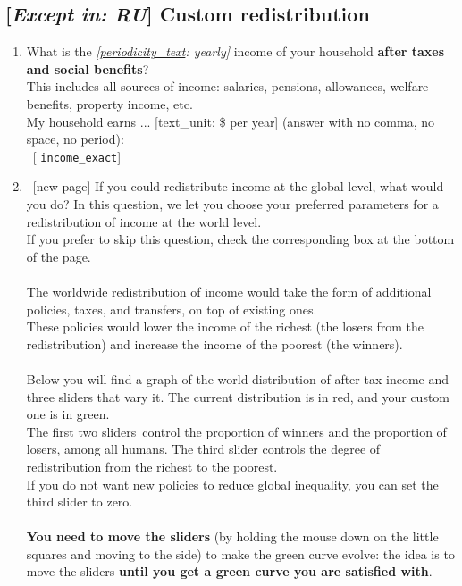 \subsection*{[\textit{Except in: RU}] Custom redistribution} 
 \begin{enumerate}[resume] 
\item \label{q:income_exact} What is the \textit{[\hyperlink{tab_features}{periodicity\_text}: yearly]} income of your household \textbf{after taxes and social benefits}?\\This includes all sources of income: salaries, pensions, allowances, welfare benefits, property income, etc.\\My household earns ... [text\_unit: \$ per year] (answer with no comma, no space, no period):\\ 
~[%
\verb|income_exact|]

\item ~[new page] \label{q:custom_redistr} If you could redistribute income at the global level, what would you do? In this question, we let you choose your preferred parameters for a redistribution of income at the world level.~\\If you prefer to skip this question, check the corresponding box at the bottom of the page.\\\\The worldwide redistribution of income would take the form of additional policies, taxes, and transfers, on top of existing ones.\\These policies would lower the income of the richest (the losers from the redistribution) and increase the income of the poorest (the winners).~\\\\Below you will find a graph of the world distribution of after-tax income and three sliders that vary it. The current distribution is in red, and your custom one is in green.~\\The first two sliders~control the proportion of winners and the proportion of losers, among all humans. The third slider controls the degree of redistribution from the richest to the poorest.~\\If you do not want new policies to reduce global inequality, you can set the third slider to zero.~\\\\\textbf{You need to move the sliders} (by holding the mouse down on the little squares and moving to the side) to make the green curve evolve: the idea is to move the sliders \textbf{until you get a green curve you are satisfied with}. \\\\


\end{enumerate}
